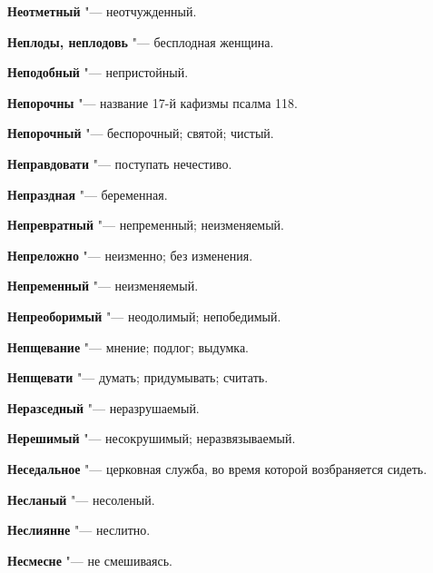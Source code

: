 \begin{mymulticols}{2}
\noindent\textbf{Неотметный} "--- неотчужденный. 




\noindent\textbf{Неплоды, неплодовь} "--- бесплодная женщина. 




\noindent\textbf{Неподобный} "--- непристойный. 




\noindent\textbf{Непорочны} "--- название 17-й кафизмы псалма 118. 




\noindent\textbf{Непорочный} "--- беспорочный; святой; чистый. 




\noindent\textbf{Неправдовати} "--- поступать нечестиво. 




\noindent\textbf{Непраздная} "--- беременная. 




\noindent\textbf{Непревратный} "--- непременный; неизменяемый. 




\noindent\textbf{Непреложно} "--- неизменно; без изменения. 




\noindent\textbf{Непременный} "--- неизменяемый. 




\noindent\textbf{Непреоборимый} "--- неодолимый; непобедимый. 




\noindent\textbf{Непщевание} "--- мнение; подлог; выдумка. 




\noindent\textbf{Непщевати} "--- думать; придумывать; считать. 




\noindent\textbf{Неразседный} "--- неразрушаемый. 




\noindent\textbf{Нерешимый} "--- несокрушимый; неразвязываемый. 




\noindent\textbf{Неседальное} "--- церковная служба, во время которой возбраняется сидеть. 




\noindent\textbf{Несланый} "--- несоленый. 




\noindent\textbf{Неслиянне} "--- неслитно. 




\noindent\textbf{Несмесне} "--- не смешиваясь. 





\end{mymulticols}
